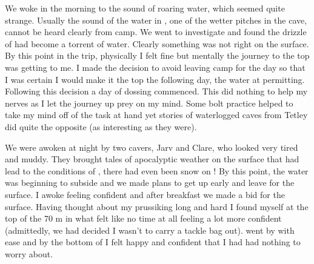 We woke in the morning to the sound of roaring water, which seemed quite
strange. Usually the sound of the water in , one of the
wetter pitches in the cave, cannot be heard clearly from camp. We went
to investigate and found the drizzle of  had become a
torrent of water. Clearly something was not right on the surface. By
this point in the trip, physically I felt fine but mentally the journey
to the top was getting to me. I made the decision to avoid leaving camp
for the day so that I was certain I would make it the top the following
day, the water at  permitting. Following this decision a
day of dossing commenced. This did nothing to help my nerves as I let
the journey up prey on my mind. Some bolt practice helped to take my
mind off of the task at hand yet stories of waterlogged caves from
Tetley did quite the opposite (as interesting as they were).

We were awoken at night by two cavers, Jarv and Clare, who looked very
tired and muddy. They brought tales of apocalyptic weather on the
surface that had lead to the conditions of , there had even
been snow on ! By this point, the water was beginning to subside
and we made plans to get up early and leave for the surface. I awoke
feeling confident and after breakfast we made a bid for the surface.
Having thought about my prussiking long and hard I found myself at the
top of the 70 m  in what felt like no time at all feeling a
lot more confident (admittedly, we had decided I wasn't to carry a
tackle bag out).  went by with ease and by the bottom of
 I felt happy and confident that I had had nothing to
worry about.

